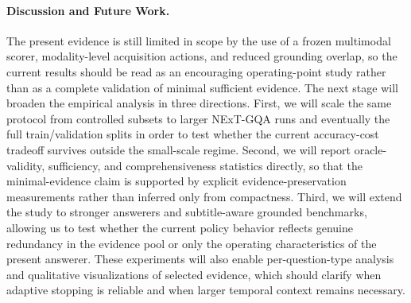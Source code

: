 \documentclass{article}
\begin{document}
\paragraph{Discussion and Future Work.} The present evidence is still limited in scope by the use of a frozen multimodal scorer, modality-level acquisition actions, and reduced grounding overlap, so the current results should be read as an encouraging operating-point study rather than as a complete validation of minimal sufficient evidence. The next stage will broaden the empirical analysis in three directions. First, we will scale the same protocol from controlled subsets to larger NExT-GQA runs and eventually the full train/validation splits in order to test whether the current accuracy-cost tradeoff survives outside the small-scale regime. Second, we will report oracle-validity, sufficiency, and comprehensiveness statistics directly, so that the minimal-evidence claim is supported by explicit evidence-preservation measurements rather than inferred only from compactness. Third, we will extend the study to stronger answerers and subtitle-aware grounded benchmarks, allowing us to test whether the current policy behavior reflects genuine redundancy in the evidence pool or only the operating characteristics of the present answerer. These experiments will also enable per-question-type analysis and qualitative visualizations of selected evidence, which should clarify when adaptive stopping is reliable and when larger temporal context remains necessary.

\clearpage


\end{document}
